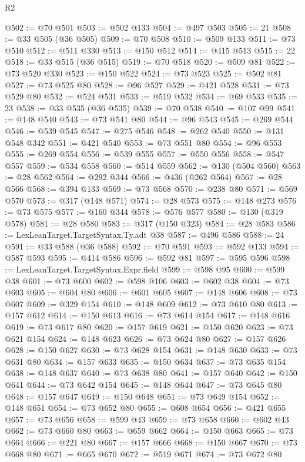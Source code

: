\begin{lexlean}{R2}
\begin{coremodule}
@502 := @70 @501
@503 := @502 @133
@504 := @497 @503
@505 := 21
@508 := @33 @505 (@36 @505)
@509 := @70 @508
@510 := @509 @133
@511 := @73 @510
@512 := @511 @330
@513 := @150 @512
@514 := @415 @513
@515 := 22
@518 := @33 @515 (@36 @515)
@519 := @70 @518
@520 := @509 @81
@522 := @73 @520 @330
@523 := @150 @522
@524 := @73 @523
@525 := @502 @81
@527 := @73 @525 @80
@528 := @96 @527
@529 := @421 @528
@531 := @73 @529 @80
@532 := @524 @531
@533 := @519 @532
@534 := @69 @533
@535 := 23
@538 := @33 @535 (@36 @535)
@539 := @70 @538
@540 := @107 @99
@541 := @148 @540
@543 := @73 @541 @80
@544 := @96 @543
@545 := @269 @544
@546 := @539 @545
@547 := @275 @546
@548 := @262 @540
@550 := @131 @548 @342
@551 := @421 @540
@553 := @73 @551 @80
@554 := @96 @553
@555 := @269 @554
@556 := @539 @555
@557 := @550 @556
@558 := @547 @557
@559 := @534 @558
@560 := @514 @559
@562 := @130 (@504 @560)
@563 := @28 @562
@564 := @292 @344
@566 := @436 (@262 @564)
@567 := @28 @566
@568 := @394 @133
@569 := @73 @568
@570 := @238 @80
@571 := @569 @570
@573 := @317 (@148 @571)
@574 := @28 @573
@575 := @148 @273
@576 := @73 @575
@577 := @160 @344
@578 := @576 @577
@580 := @130 (@319 @578)
@581 := @28 @580
@583 := @317 (@150 @323)
@584 := @28 @583
@586 := LexLeanTarget.TargetSyntax.Ty.adt @38
@587 := @496 @586
@588 := 24
@591 := @33 @588 (@36 @588)
@592 := @70 @591
@593 := @592 @133
@594 := @587 @593
@595 := @414 @586
@596 := @592 @81
@597 := @595 @596
@598 := LexLeanTarget.TargetSyntax.Expr.field
@599 := @598 @95
@600 := @599 @38
@601 := @73 @600
@602 := @598 @106
@603 := @602 @38
@604 := @73 @603
@605 := @604 @80
@606 := @601 @605
@607 := @148 @606
@608 := @73 @607
@609 := @329 @154
@610 := @148 @609
@612 := @73 @610 @80
@613 := @157 @612
@614 := @150 @613
@616 := @73 @614 @154
@617 := @148 @616
@619 := @73 @617 @80
@620 := @157 @619
@621 := @150 @620
@623 := @73 @621 @154
@624 := @148 @623
@626 := @73 @624 @80
@627 := @157 @626
@628 := @150 @627
@630 := @73 @628 @154
@631 := @148 @630
@633 := @73 @631 @80
@634 := @157 @633
@635 := @150 @634
@637 := @73 @635 @154
@638 := @148 @637
@640 := @73 @638 @80
@641 := @157 @640
@642 := @150 @641
@644 := @73 @642 @154
@645 := @148 @644
@647 := @73 @645 @80
@648 := @157 @647
@649 := @150 @648
@651 := @73 @649 @154
@652 := @148 @651
@654 := @73 @652 @80
@655 := @608 @654
@656 := @421 @655
@657 := @73 @656
@658 := @599 @43
@659 := @73 @658
@660 := @602 @43
@662 := @73 @660 @80
@663 := @659 @662
@664 := @150 @663
@665 := @73 @664
@666 := @221 @80
@667 := @157 @666
@668 := @150 @667
@670 := @73 @668 @80
@671 := @665 @670
@672 := @519 @671
@674 := @73 @672 @80

\end{coremodule}
\end{lexlean}
